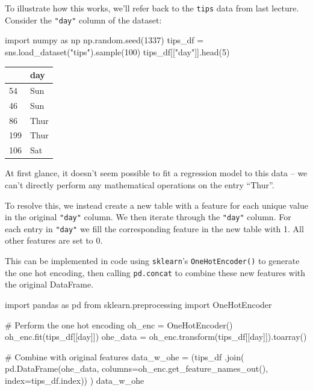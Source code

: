 \documentclass[
  letterpaper,
  DIV=11,
  numbers=noendperiod]{scrreprt}
\newenvironment{Shaded}{\begin{snugshade}}{\end{snugshade}}
\newcommand{\CommentTok}[1]{\textcolor[rgb]{0.37,0.37,0.37}{#1}}
\newcommand{\DecValTok}[1]{\textcolor[rgb]{0.68,0.00,0.00}{#1}}
\newcommand{\ImportTok}[1]{\textcolor[rgb]{0.00,0.46,0.62}{#1}}
\newcommand{\NormalTok}[1]{\textcolor[rgb]{0.00,0.23,0.31}{#1}}
\newcommand{\OperatorTok}[1]{\textcolor[rgb]{0.37,0.37,0.37}{#1}}
\newcommand{\StringTok}[1]{\textcolor[rgb]{0.13,0.47,0.30}{#1}}
\begin{document}
To illustrate how this works, we'll refer back to the \texttt{tips} data
from last lecture. Consider the \texttt{"day"} column of the dataset:

\begin{Shaded}
\begin{Highlighting}[]
\ImportTok{import}\NormalTok{ numpy }\ImportTok{as}\NormalTok{ np}
\NormalTok{np.random.seed(}\DecValTok{1337}\NormalTok{)}
\NormalTok{tips\_df }\OperatorTok{=}\NormalTok{ sns.load\_dataset(}\StringTok{"tips"}\NormalTok{).sample(}\DecValTok{100}\NormalTok{)}
\NormalTok{tips\_df[[}\StringTok{"day"}\NormalTok{]].head(}\DecValTok{5}\NormalTok{)}
\end{Highlighting}
\end{Shaded}

\begin{tabular}{ll}
\toprule
{} &   day \\
\midrule
54  &   Sun \\
46  &   Sun \\
86  &  Thur \\
199 &  Thur \\
106 &   Sat \\
\bottomrule
\end{tabular}

At first glance, it doesn't seem possible to fit a regression model to
this data -- we can't directly perform any mathematical operations on
the entry ``Thur''.

To resolve this, we instead create a new table with a feature for each
unique value in the original \texttt{"day"} column. We then iterate
through the \texttt{"day"} column. For each entry in \texttt{"day"} we
fill the corresponding feature in the new table with 1. All other
features are set to 0.

This can be implemented in code using \texttt{sklearn}'s
\texttt{OneHotEncoder()} to generate the one hot encoding, then calling
\texttt{pd.concat} to combine these new features with the original
DataFrame.

\begin{Shaded}
\begin{Highlighting}[]
\ImportTok{import}\NormalTok{ pandas }\ImportTok{as}\NormalTok{ pd}
\ImportTok{from}\NormalTok{ sklearn.preprocessing }\ImportTok{import}\NormalTok{ OneHotEncoder}

\CommentTok{\# Perform the one hot encoding}
\NormalTok{oh\_enc }\OperatorTok{=}\NormalTok{ OneHotEncoder()}
\NormalTok{oh\_enc.fit(tips\_df[[}\StringTok{\textquotesingle{}day\textquotesingle{}}\NormalTok{]])}
\NormalTok{ohe\_data }\OperatorTok{=}\NormalTok{ oh\_enc.transform(tips\_df[[}\StringTok{\textquotesingle{}day\textquotesingle{}}\NormalTok{]]).toarray()}


\CommentTok{\# Combine with original features}
\NormalTok{data\_w\_ohe }\OperatorTok{=}\NormalTok{ (tips\_df}
\NormalTok{              .join(}
\NormalTok{                  pd.DataFrame(ohe\_data, columns}\OperatorTok{=}\NormalTok{oh\_enc.get\_feature\_names\_out(), index}\OperatorTok{=}\NormalTok{tips\_df.index))}
\NormalTok{             )}
\NormalTok{data\_w\_ohe}
\end{Highlighting}
\end{Shaded}
\end{document}
